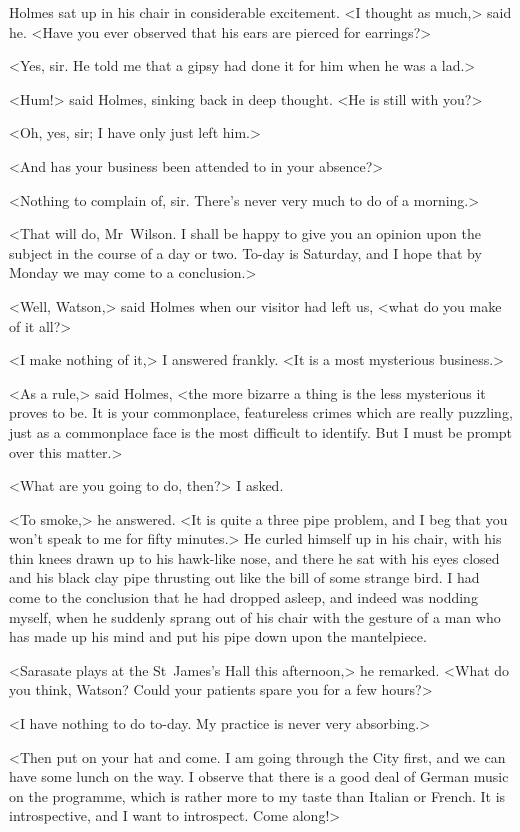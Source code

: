 Holmes sat up in his chair in considerable excitement. <I thought as much,> said he. <Have you ever observed that his ears are pierced for earrings?>

<Yes, sir. He told me that a gipsy had done it for him when he was a lad.>

<Hum!> said Holmes, sinking back in deep thought. <He is still with you?>

<Oh, yes, sir; I have only just left him.>

<And has your business been attended to in your absence?>

<Nothing to complain of, sir. There's never very much to do of a morning.>

<That will do, Mr~Wilson. I shall be happy to give you an opinion upon the subject in the course of a day or two. To-day is Saturday, and I hope that by Monday we may come to a conclusion.>

<Well, Watson,> said Holmes when our visitor had left us, <what do you make of it all?>

<I make nothing of it,> I answered frankly. <It is a most mysterious business.>

<As a rule,> said Holmes, <the more bizarre a thing is the less mysterious it proves to be. It is your commonplace, featureless crimes which are really puzzling, just as a commonplace face is the most difficult to identify. But I must be prompt over this matter.>

<What are you going to do, then?> I asked.

<To smoke,> he answered. <It is quite a three pipe problem, and I beg that you won't speak to me for fifty minutes.> He curled himself up in his chair, with his thin knees drawn up to his hawk-like nose, and there he sat with his eyes closed and his black clay pipe thrusting out like the bill of some strange bird. I had come to the conclusion that he had dropped asleep, and indeed was nodding myself, when he suddenly sprang out of his chair with the gesture of a man who has made up his mind and put his pipe down upon the mantelpiece.

<Sarasate plays at the St~James's Hall this afternoon,> he remarked. <What do you think, Watson? Could your patients spare you for a few hours?>

<I have nothing to do to-day. My practice is never very absorbing.>

<Then put on your hat and come. I am going through the City first, and we can have some lunch on the way. I observe that there is a good deal of German music on the programme, which is rather more to my taste than Italian or French. It is introspective, and I want to introspect. Come along!>

